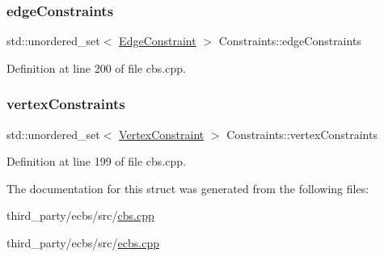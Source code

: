 \subsubsection{\texorpdfstring{edge\+Constraints}{edgeConstraints}}
{\footnotesize\ttfamily std\+::unordered\+\_\+set$<$ \hyperlink{struct_edge_constraint}{Edge\+Constraint} $>$ Constraints\+::edge\+Constraints}



Definition at line 200 of file cbs.\+cpp.

\mbox{\label{struct_constraints_a37939c965d84c37e5b4a52b6c5a2fd48}} 
\subsubsection{\texorpdfstring{vertex\+Constraints}{vertexConstraints}}
{\footnotesize\ttfamily std\+::unordered\+\_\+set$<$ \hyperlink{struct_vertex_constraint}{Vertex\+Constraint} $>$ Constraints\+::vertex\+Constraints}



Definition at line 199 of file cbs.\+cpp.



The documentation for this struct was generated from the following files\+:\begin{DoxyCompactItemize}
\item 
third\+\_\+party/ecbs/src/\hyperlink{cbs_8cpp}{cbs.\+cpp}\item 
third\+\_\+party/ecbs/src/\hyperlink{ecbs_8cpp}{ecbs.\+cpp}\end{DoxyCompactItemize}
